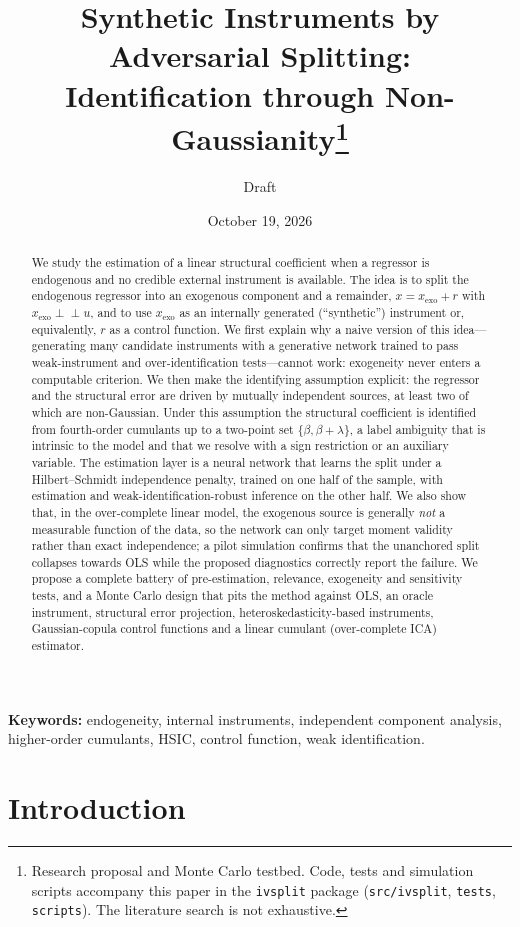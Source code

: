 \documentclass[11pt]{article}
\title{Synthetic Instruments by Adversarial Splitting:\\
Identification through Non-Gaussianity\thanks{Research proposal and Monte Carlo testbed.
Code, tests and simulation scripts accompany this paper in the \texttt{ivsplit} package
(\texttt{src/ivsplit}, \texttt{tests}, \texttt{scripts}). The literature search is not exhaustive.}}
\author{Draft}
\date{October 19, 2026}
\theoremstyle{definition}
\theoremstyle{remark}
\newcommand{\indep}{\perp\!\!\!\perp}
\newcommand{\xexo}{x_{\mathrm{exo}}}
\begin{document}
\maketitle

\begin{abstract}
We study the estimation of a linear structural coefficient when a regressor is endogenous and no
credible external instrument is available. The idea is to split the endogenous regressor into an
exogenous component and a remainder, $x = \xexo + r$ with $\xexo \indep u$, and to use $\xexo$ as an
internally generated (``synthetic'') instrument or, equivalently, $r$ as a control function. We
first explain why a naive version of this idea---generating many candidate instruments with a
generative network trained to pass weak-instrument and over-identification tests---cannot work:
exogeneity never enters a computable criterion. We then make the identifying assumption explicit:
the regressor and the structural error are driven by mutually independent sources, at least two of
which are non-Gaussian. Under this assumption the structural coefficient is identified from
fourth-order cumulants up to a two-point set $\{\beta,\beta+\lambda\}$, a label ambiguity that is
intrinsic to the model and that we resolve with a sign restriction or an auxiliary variable. The
estimation layer is a neural network that learns the split under a Hilbert--Schmidt independence
penalty, trained on one half of the sample, with estimation and weak-identification-robust
inference on the other half. We also show that, in the over-complete linear model, the exogenous
source is generally \emph{not} a measurable function of the data, so the network can only target
moment validity rather than exact independence; a pilot simulation confirms that the unanchored
split collapses towards OLS while the proposed diagnostics correctly report the failure. We
propose a complete battery of pre-estimation, relevance, exogeneity and sensitivity tests, and a
Monte Carlo design that pits the method against OLS, an oracle instrument, structural error
projection, heteroskedasticity-based instruments, Gaussian-copula control functions and a linear
cumulant (over-complete ICA) estimator.
\end{abstract}

\noindent\textbf{Keywords:} endogeneity, internal instruments, independent component analysis,
higher-order cumulants, HSIC, control function, weak identification.

\section{Introduction}\label{sec:intro}
\end{document}
